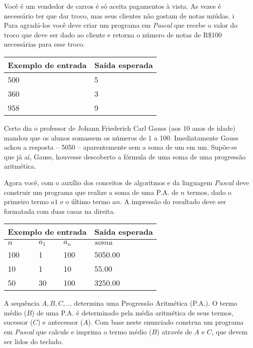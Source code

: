 \item Você é um vendedor de carros é só aceita pagamentos à vista. As vezes 
é necessário ter que dar troco, mas seus clientes não gostam de notas miúdas. i
Para agradá-los você deve criar um programa em \emph{Pascal} que recebe o valor
do troco que deve ser dado ao cliente e retorna o número de notas de R\$100 
necessárias para esse troco.

\begin{center}
\begin{tabular}{|l|l|} \hline
Exemplo de entrada & Saída esperada \\ \hline
500                & 5               \\ \hline
360                & 3               \\ \hline
958                & 9               \\ \hline
\end{tabular}
\end{center}

\item Certo dia o professor de Johann Friederich Carl Gauss (aos 10 anos de 
idade) mandou que os alunos somassem os números de 1 a 100. Imediatamente 
Gauss achou a resposta – 5050 – aparentemente sem a soma de um em um. 
Supõe-se que já aí, Gauss, houvesse descoberto a fórmula de uma soma de uma 
progressão aritmética.

Agora você, com o auxílio dos conceitos de algoritmos e da linguagem 
\emph{Pascal} deve construir um programa que realize a soma de uma P.A. 
de $n$ termos, dado o primeiro termo $a1$ e o último termo $an$.
A impressão do resultado deve ser formatada com duas casas na direita.

\begin{center}
\begin{tabular}{|l|l|l|l|} \hline
\multicolumn{3}{|c|}{Exemplo de entrada} & Saída esperada \\ \hline
$n$ & $a_1$ & $a_n$   & $soma$               \\ \hline
100 & 1 & 100         & 5050.00                \\ \hline
10 & 1 & 10          & 55.00             \\ \hline
50 & 30 & 100         & 3250.00          \\ \hline
\end{tabular}
\end{center}

\item A sequência $A, B, C, \ldots$ determina uma Progressão Aritmética (P.A.). 
O termo médio ($B$) de uma P.A. é determinado pela média aritmética de seus 
termos, sucessor ($C$) e antecessor ($A$). Com base neste enunciado construa 
um programa em \emph{Pascal} que calcule e imprima o termo médio ($B$) 
através de $A$ e $C$, que devem ser lidos do teclado.

